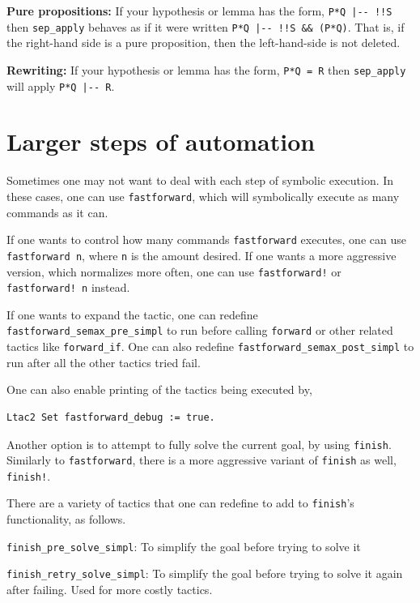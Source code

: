 \documentclass[12pt,fleqn,openany,oneside,showtrims]{memoir}
\begin{document}
\textbf{Pure propositions:} If your hypothesis or lemma has the form,
\lstinline{P*Q |-- !!S} then
\lstinline{sep_apply} behaves as if it were written
\lstinline{P*Q |-- !!S && (P*Q)}.
That is, if the right-hand side is a pure proposition,
then the left-hand-side is not deleted.

\textbf{Rewriting:} If your hypothesis or lemma has the form,
\lstinline{P*Q = R} then \lstinline{sep_apply} will apply
\lstinline{P*Q |-- R}.

\chapter{Larger steps of automation}

\label{refcard:fastforward}
Sometimes one may not want to deal with each step of symbolic execution.
In these cases, one can use \lstinline{fastforward}, which will symbolically execute
as many commands as it can.

If one wants to control how many commands \lstinline{fastforward} executes, one can use
\lstinline{fastforward n}, where \lstinline{n} is the amount desired. If one wants a
more aggressive version, which normalizes more often, one can use \lstinline{fastforward!}
or \lstinline{fastforward! n} instead.

If one wants to expand the tactic, one can redefine
\lstinline{fastforward_semax_pre_simpl} to run before calling \lstinline{forward} or
other related tactics like \lstinline{forward_if}. One can also redefine
\lstinline{fastforward_semax_post_simpl} to run after all the other tactics tried fail.

One can also enable printing of the tactics being executed by,
\begin{lstlisting}
Ltac2 Set fastforward_debug := true.
\end{lstlisting}

\label{refcard:finish}
Another option is to attempt to fully solve the current goal, by using
\lstinline{finish}. Similarly to \lstinline{fastforward}, there is a more
aggressive variant of \lstinline{finish} as well, \lstinline{finish!}.

There are a variety of tactics that one can redefine to add to \lstinline{finish}'s
functionality, as follows.

\lstinline{finish_pre_solve_simpl}: To simplify the goal before trying to solve it

\lstinline{finish_retry_solve_simpl}: To simplify the goal before trying to solve it
  again after failing. Used for more costly tactics.
\end{document}
